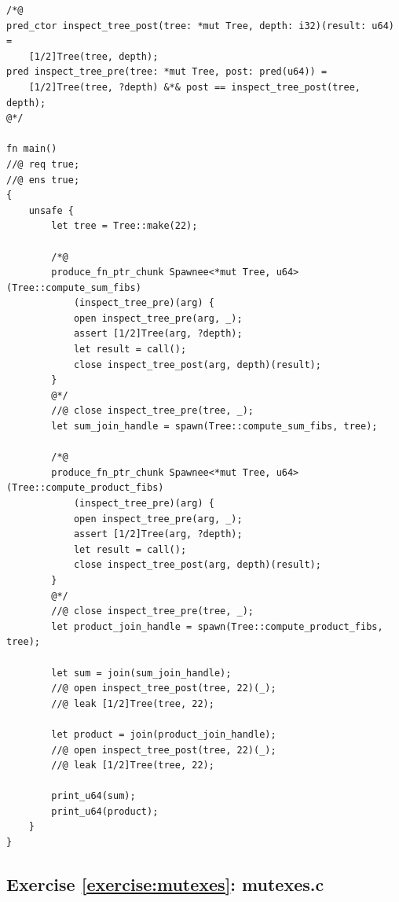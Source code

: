 \documentclass{article}
\begin{document}
\begin{lstlisting}
/*@
pred_ctor inspect_tree_post(tree: *mut Tree, depth: i32)(result: u64) =
    [1/2]Tree(tree, depth);
pred inspect_tree_pre(tree: *mut Tree, post: pred(u64)) =
    [1/2]Tree(tree, ?depth) &*& post == inspect_tree_post(tree, depth);
@*/

fn main()
//@ req true;
//@ ens true;
{
    unsafe {
        let tree = Tree::make(22);
        
        /*@
        produce_fn_ptr_chunk Spawnee<*mut Tree, u64>(Tree::compute_sum_fibs)
            (inspect_tree_pre)(arg) {
            open inspect_tree_pre(arg, _);
            assert [1/2]Tree(arg, ?depth);
            let result = call();
            close inspect_tree_post(arg, depth)(result);
        }
        @*/
        //@ close inspect_tree_pre(tree, _);
        let sum_join_handle = spawn(Tree::compute_sum_fibs, tree);
        
        /*@
        produce_fn_ptr_chunk Spawnee<*mut Tree, u64>(Tree::compute_product_fibs)
            (inspect_tree_pre)(arg) {
            open inspect_tree_pre(arg, _);
            assert [1/2]Tree(arg, ?depth);
            let result = call();
            close inspect_tree_post(arg, depth)(result);
        }
        @*/
        //@ close inspect_tree_pre(tree, _);
        let product_join_handle = spawn(Tree::compute_product_fibs, tree);
        
        let sum = join(sum_join_handle);
        //@ open inspect_tree_post(tree, 22)(_);
        //@ leak [1/2]Tree(tree, 22);
        
        let product = join(product_join_handle);
        //@ open inspect_tree_post(tree, 22)(_);
        //@ leak [1/2]Tree(tree, 22);
        
        print_u64(sum);
        print_u64(product);
    }
}
\end{lstlisting}

\subsection{Exercise \ref{exercise:mutexes}:
mutexes.c}\label{solution:mutexes}
\end{document}
